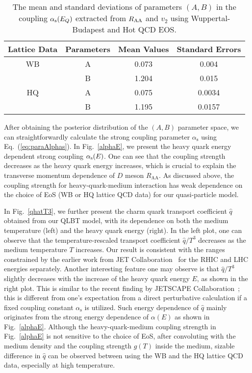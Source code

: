 \documentclass[aps,superscriptaddress,prc,twocolumn,nofootinbib]{revtex4}
\begin{document}
\begin{table}[htb]
\label{tab:4}
\centering
\vspace{-5pt}
\begin{tabular}{c|c|c|c}
 \hline
 Lattice Data & Parameters & Mean Values & Standard Errors  \\
 \hline
  WB   & A & 0.073 & 0.004   \\
      & B & 1.204 & 0.015   \\ \hline
  HQ   & A & 0.075 & 0.0034  \\
  	  & B & 1.195 & 0.0157   \\
  \hline
\end{tabular}
	\caption{The mean and standard deviations of parameters $(A,B)$ in the coupling $\alpha_{\rm s}(E_Q)$ extracted from $R_{\rm AA}$ and $v_2$ using Wuppertal-Budapest and Hot QCD EOS.}
\end{table}


After obtaining the posterior distribution of the $(A, B)$ parameter space, we can straightforwardly calculate the strong coupling parameter $\alpha_\mathrm{s}$ using Eq.~(\ref{eq:paraAlphas}). In Fig.~\ref{alphaE}, we present the heavy quark energy dependent strong coupling $\alpha_{\rm s}(E)$. One can see that the coupling strength decreases as the heavy quark energy increases, which is crucial to explain the transverse momentum dependence of $D$ meson $R_\mathrm{AA}$. As discussed above, the coupling strength for heavy-quark-medium interaction has weak dependence on the choice of EoS (WB or HQ lattice QCD data) for our quasi-particle model.

In Fig.~\ref{qhatT3}, we further present the charm quark transport coefficient $\hat{q}$ obtained from our QLBT model, with its dependence on both the medium temperature (left) and the heavy quark energy (right). In the left plot, one can observe that the temperature-rescaled transport coefficient $\hat{q}/T^3$ decreases as the medium temperature $T$ increases. Our result is consistent with the ranges constrained by the earlier work from JET Collaboration~\cite{Burke:2013yra} for the RHIC and LHC energies separately. Another interesting feature one may observe is that $\hat{q}/T^3$ slightly decreases with the increase of the heavy quark energy $E$, as shown in the right plot. This is similar to the recent finding by JETSCAPE Collaboration~\cite{Cao:2021keo}; this is different from one's expectation from a direct perturbative calculation if a fixed coupling constant $\alpha_\mathrm{s}$ is utilized. Such energy dependence of $\hat{q}$ mainly originates from the strong energy dependence of $\alpha(E)$ as shown in Fig.~\ref{alphaE}. Although the heavy-quark-medium coupling strength in Fig.~\ref{alphaE} is not sensitive to the choice of EoS, after convoluting with the medium density and the coupling strength $g(T)$ inside the medium, sizable difference in $\hat{q}$ can be observed between using the WB and the HQ lattice QCD data, especially at high temperature.
\end{document}
